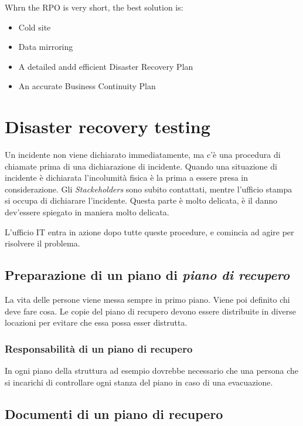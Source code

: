 
Whrn the RPO is very short, the best solution is:
\begin{itemize}
  \item Cold site
  \item Data mirroring
  \item A detailed andd efficient Disaster Recovery Plan
  \item An accurate Business Continuity Plan
\end{itemize}

\section{Disaster recovery testing}

Un incidente non viene dichiarato immediatamente, ma c'è una procedura di 
chiamate prima di una dichiarazione di incidente. Quando una situazione di 
incidente è dichiarata l'incolumità fisica è la prima a essere presa in 
considerazione. Gli \textit{Stackeholders} sono subito contattati, mentre 
l'ufficio stampa si occupa di dichiarare l'incidente. Questa parte è molto 
delicata, è il danno dev'essere spiegato in maniera molto delicata.

L'ufficio IT entra in azione dopo tutte queste procedure, e comincia ad agire 
per risolvere il problema.

\subsection{Preparazione di un piano di \textit{piano di recupero}}

La vita delle persone viene messa sempre in primo piano. Viene poi definito chi 
deve fare cosa. Le copie del piano di recupero devono essere distribuite in 
diverse locazioni per evitare che essa possa esser distrutta.

\subsubsection{Responsabilità di un piano di recupero}

In ogni piano della struttura ad esempio dovrebbe necessario che una persona 
che si incarichi di controllare ogni stanza del piano in caso di una 
evacuazione.

\subsection{Documenti di un piano di recupero}

